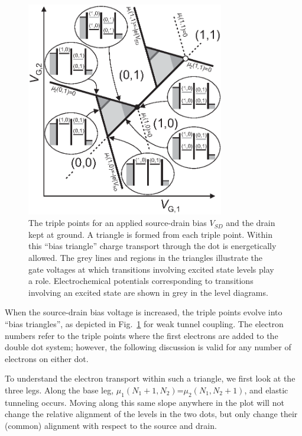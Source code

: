 \documentclass[12pt,aps,nofootinbib]{revtex4-1}
\begin{document}
\begin{figure}[htb]
\includegraphics[width=3.4in, clip=true]{hanson_fig30.eps}
\caption{The triple points for an applied source-drain bias
$V_{SD}$ and the drain kept at ground. A triangle is formed from
each triple point. Within this ``bias triangle'' charge transport
through the dot is energetically allowed. The grey lines and
regions in the triangles illustrate the gate voltages at which
transitions involving excited state levels play a role.
Electrochemical potentials corresponding to transitions involving
an excited state are shown in grey in the level diagrams.}
\label{Fig:DDbiastriangles}
\end{figure}

When the source-drain bias voltage is increased, the triple points
evolve into ``bias triangles'', as depicted in
Fig.~\ref{Fig:DDbiastriangles} for weak tunnel coupling. The
electron numbers refer to the triple points where the first
electrons are added to the double dot system; however, the
following discussion is valid for any number of electrons on
either dot.

To understand the electron transport within such a triangle, we
first look at the three legs. Along the base leg, $\mu_{1}(N_{1}+1,N_{2})$=$\mu _{2}(N_{1},N_{2}+1)$, and elastic
tunneling occurs. Moving along this same slope anywhere in the
plot will not change the relative alignment of the levels in the
two dots, but only change their (common) alignment with respect to
the source and drain.
\end{document}
